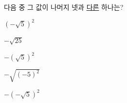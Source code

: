 다음 중 그 값이 나머지 넷과 \underline{다른} 하나는?
\begin{choices32}{\rule[-3ex]{0pt}{8ex}$(-\sqrt{5})^2$}{\rule[-3ex]{0pt}{8ex}$-\sqrt{25}$}{\rule[-3ex]{0pt}{8ex}$-(\sqrt{5})^2$}{\rule[-3ex]{0pt}{8ex}$-\sqrt{(-5)^2}$}{\rule[-3ex]{0pt}{8ex}$-(-\sqrt{5})^2$}\end{choices32}

